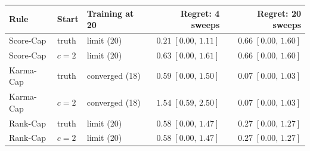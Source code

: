 \begin{tabular}{lllrr}
\toprule
Rule & Start & Training at 20 & Regret: 4 sweeps & Regret: 20 sweeps \\
\midrule
Score-Cap & truth & limit (20) & \(0.21\;[0.00,\,1.11]\) & \(0.66\;[0.00,\,1.60]\) \\
Score-Cap & $c=2$ & limit (20) & \(0.63\;[0.00,\,1.61]\) & \(0.66\;[0.00,\,1.60]\) \\
Karma-Cap & truth & converged (18) & \(0.59\;[0.00,\,1.50]\) & \(0.07\;[0.00,\,1.03]\) \\
Karma-Cap & $c=2$ & converged (18) & \(1.54\;[0.59,\,2.50]\) & \(0.07\;[0.00,\,1.03]\) \\
Rank-Cap & truth & limit (20) & \(0.58\;[0.00,\,1.47]\) & \(0.27\;[0.00,\,1.27]\) \\
Rank-Cap & $c=2$ & limit (20) & \(0.58\;[0.00,\,1.47]\) & \(0.27\;[0.00,\,1.27]\) \\
\bottomrule
\end{tabular}
